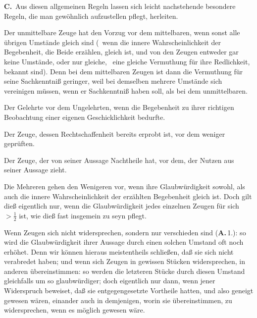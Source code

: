 \vabst \textbf{C.}~Aus diesen allgemeinen Regeln lassen sich leicht nachstehende besondere Regeln, die man gewöhnlich aufzustellen pflegt, herleiten.
\begin{aufzb}
\item Der unmittelbare Zeuge hat den Vorzug vor dem mittelbaren, wenn sonst alle übrigen Umstände gleich sind (\dh\ wenn die innere Wahrscheinlichkeit der Begebenheit, die Beide erzählen, gleich ist, und von den Zeugen entweder gar keine Umstände, oder nur gleiche, \zB\ eine gleiche Vermuthung für ihre Redlichkeit, bekannt sind). Denn bei dem mittelbaren Zeugen ist dann die Vermuthung für seine Sachkenntniß geringer, weil bei demselben mehrere Umstände sich vereinigen müssen, wenn er Sachkenntniß haben soll, als bei dem unmittelbaren.
\item Der Gelehrte vor dem Ungelehrten, wenn die Begebenheit zu ihrer richtigen Beobachtung einer eigenen Geschicklichkeit bedurfte.
\item Der Zeuge, dessen Rechtschaffenheit bereits erprobt ist, vor dem weniger geprüften.
\item Der Zeuge, der von seiner Aussage Nachtheile hat, vor dem, der Nutzen aus seiner Aussage zieht.
\item Die Mehreren gehen den Wenigeren vor, wenn ihre Glaubwürdigkeit sowohl, als auch die innere Wahrscheinlichkeit der erzählten Begebenheit gleich ist. Doch gilt dieß eigentlich nur, wenn die Glaubwürdigkeit jedes
einzelnen Zeugen für sich $> \frac{1}{2}$ ist, wie dieß fast insgemein zu seyn pflegt.~
\begin{RWanm} Wenn Zeugen sich nicht widersprechen, sondern nur verschieden sind (\textbf{A.}\,1.): so wird die Glaubwürdigkeit ihrer Aussage durch einen solchen Umstand oft noch erhöhet. Denn wir können hieraus meistentheils schließen, daß sie sich nicht verabredet haben; und wenn sich Zeugen in gewissen Stücken widersprechen, in anderen übereinstimmen: so werden die letzteren Stücke durch diesen Umstand gleichfalls um so glaubwürdiger; doch eigentlich nur dann, wenn jener Widerspruch beweiset, daß sie entgegengesetzte Vortheile hatten, und also geneigt gewesen wären, einander auch in demjenigen, worin sie übereinstimmen, zu widersprechen, wenn es möglich gewesen wäre.
\end{RWanm}
\end{aufzb}

